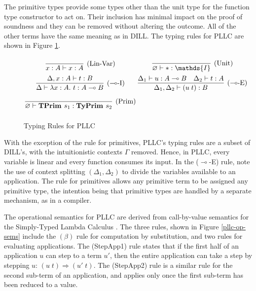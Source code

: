 \documentclass[]{unswthesis}
\let\emptyset\varnothing
\newcommand{\lam}[1]{\lambda #1 \ldotp \,}
\newcommand{\app}[2]{(#1 \; #2)}
\newcommand{\lolly}{\multimap}
\newcommand{\types}{\vdash}
\newcommand{\steps}{\Rightarrow}
\newcommand{\TyPrim}[1]{\b{TyPrim } #1}
\newcommand{\TPrim}[1]{\b{TPrim } #1}
\let\b\textbf
\let\t\text
\begin{document}
The primitive types provide some types other than the unit type for the function type constructor to act on. Their inclusion has minimal impact on the proof of soundness and they can be removed without altering the outcome. All of the other terms have the same meaning as in DILL. The typing rules for PLLC are shown in Figure \ref{pllc-typing-rules}.

\begin{figure}[h]
\caption{Typing Rules for PLLC}
\label{pllc-typing-rules}
\begin{displaymath}
\arraycolsep=1.4pt\def\arraystretch{2.2}
\begin{array}{cc}
\infer[\text{(Lin-Var)}]{x : A \types x : A}{} &
\infer[\text{(Unit)}]{\emptyset \types * : \mathds{I}}{} \\
\infer[\text{($\lolly$-I)}]
  {\Delta \types \lam{x : A} t : A \lolly B}
  {\Delta, x : A \types t : B} &
\infer[\text{($\lolly$-E)}]
  {\Delta_1, \Delta_2 \types \app{u}{t} : B}
  {\Delta_1 \types u : A \lolly B  & \Delta_2 \types t : A} \\
\infer[\t{(Prim)}]{\emptyset \types \TPrim{s_1} : \TyPrim{s_2}}{} \\
\end{array}
\end{displaymath}
\end{figure}

With the exception of the rule for primitives, PLLC's typing rules are a subset of DILL's, with the intuitionistic contexts $\Gamma$ removed. Hence, in PLLC, every variable is linear and every function consumes its input. In the ($\lolly$-E) rule, note the use of context splitting $(\Delta_1, \Delta_2)$ to divide the variables available to an application. The rule for primitives allows any primitive term to be assigned any primitive type, the intention being that primitive types are handled by a separate mechanism, as in a compiler.

The operational semantics for PLLC are derived from call-by-value semantics for the Simply-Typed Lambda Calculus \cite{pierce15}. The three rules, shown in Figure \ref{pllc-op-sems} include the $(\beta)$ rule for computation by substitution, and two rules for evaluating applications. The (StepApp1) rule states that if the first half of an application $u$ can step to a term $u'$, then the entire application can take a step by stepping $u$: $\app{u}{t} \steps \app{u'}{t}$. The (StepApp2) rule is a similar rule for the second sub-term of an application, and applies only once the first sub-term has been reduced to a value.
\end{document}
